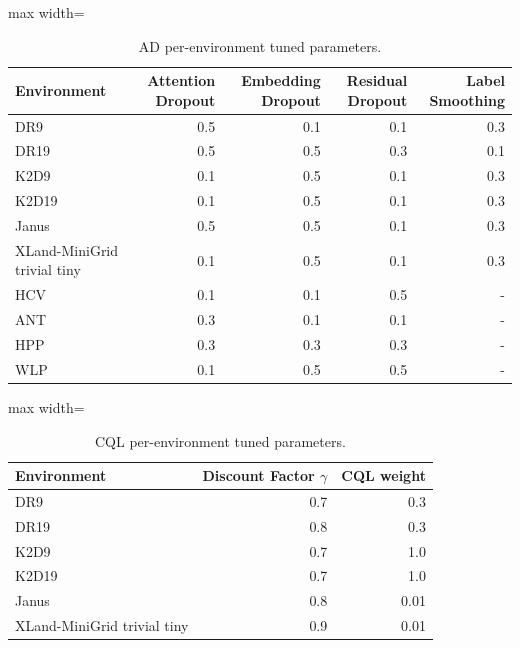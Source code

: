 \documentclass{article}
\begin{document}
\begin{table}[ht]
    \label{tab:}
    \begin{center}
    \caption{AD per-environment tuned parameters.}
    \begin{small}
    \begin{adjustbox}{max width=\columnwidth}
		\begin{tabular}{l|rrrr}
		\toprule
	\textbf{Environment} & \textbf{Attention Dropout} & \textbf{Embedding Dropout} & \textbf{Residual Dropout} & \textbf{Label Smoothing}\\
\midrule
DR9 & 0.5 & 0.1 & 0.1 & 0.3\\
DR19 & 0.5 & 0.5 & 0.3 & 0.1\\
K2D9 & 0.1 & 0.5 & 0.1 & 0.3\\
K2D19 & 0.1 & 0.5 & 0.1 & 0.3\\
Janus & 0.5 & 0.5 & 0.1 & 0.3\\
XLand-MiniGrid trivial tiny & 0.1 & 0.5 & 0.1 & 0.3\\
HCV & 0.1 & 0.1 & 0.5 & -\\
ANT & 0.3 & 0.1 & 0.1 & -\\
HPP & 0.3 & 0.3 & 0.3 & -\\
WLP & 0.1 & 0.5 & 0.5 & -\\
\bottomrule
\end{tabular}
        \end{adjustbox}
    \end{small}
    \end{center}
    \vskip -0.1in
\end{table}
\begin{table}[ht]
    \label{tab:}
    \begin{center}
 \caption{CQL per-environment tuned parameters.}
    \begin{small}
    \begin{adjustbox}{max width=\columnwidth}
		\begin{tabular}{l|rr}
		\toprule
	\textbf{Environment} & \textbf{Discount Factor $\gamma$} & \textbf{CQL weight} \\
\midrule
    DR9 & 0.7 & 0.3\\
DR19 & 0.8 & 0.3 \\
K2D9 & 0.7 & 1.0 \\
K2D19 & 0.7 & 1.0 \\
Janus & 0.8 & 0.01 \\
XLand-MiniGrid trivial tiny & 0.9 & 0.01 \\
\bottomrule
\end{tabular}
        \end{adjustbox}
    \end{small}
    \end{center}
    \vskip -0.1in
\end{table}
\end{document}
